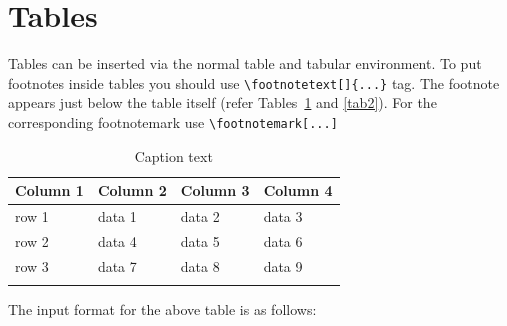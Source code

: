 \documentclass[default,pdflatex,iicol]{sn-jnl}%
\begin{document}
\section{Tables}\label{sec5}

Tables can be inserted via the normal table and tabular environment. To put
footnotes inside tables you should use \verb+\footnotetext[]{...}+ tag.
The footnote appears just below the table itself (refer Tables~\ref{tab1} and \ref{tab2}). 
For the corresponding footnotemark use \verb+\footnotemark[...]+

\begin{table}[h]
\begin{center}
\begin{minipage}{174pt}
\caption{Caption text}\label{tab1}%
\begin{tabular}{@{}llll@{}}
\toprule
Column 1 & Column 2  & Column 3 & Column 4\\
\midrule
row 1    & data 1   & data 2  & data 3  \\
row 2    & data 4   & data 5\footnotemark[1]  & data 6  \\
row 3    & data 7   & data 8  & data 9\footnotemark[2]  \\
\botrule
\end{tabular}
\end{minipage}
\end{center}
\end{table}

\noindent
The input format for the above table is as follows:
\end{document}

